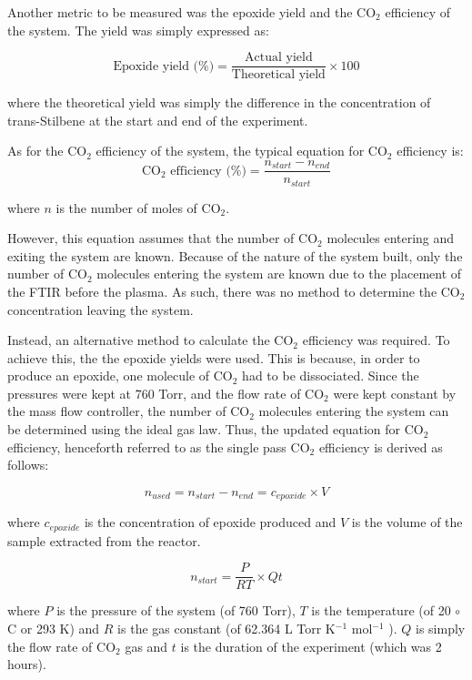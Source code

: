 Another metric to be measured was the epoxide yield and the CO$_2$ efficiency of the system. The yield was simply expressed as:

\begin{equation}
    \text{Epoxide yield (\%)} = \frac{\text{Actual yield}}{\text{Theoretical yield}} \times 100
\end{equation}

where the theoretical yield was simply the difference in the concentration of trans-Stilbene at the start and end of the experiment.

As for the CO$_2$ efficiency of the system, the typical equation for CO$_2$ efficiency is:
\begin{equation}
    \text{CO$_2$ efficiency (\%)} = \frac{n_{start} - n_{end}}{n_{start}}
\end{equation}

where $n$ is the number of moles of CO$_2$. 

However, this equation assumes that the number of CO$_2$ molecules entering and exiting the system are known. Because of the nature of the system built, only the number of CO$_2$ molecules entering the system are known due to the placement of the FTIR before the plasma. As such, there was no method to determine the CO$_2$ concentration leaving the system. 

Instead, an alternative method to calculate the CO$_2$ efficiency was required. To achieve this, the the epoxide yields were used. This is because, in order to produce an epoxide, one molecule of CO$_2$ had to be dissociated. Since the pressures were kept at 760 Torr, and the flow rate of CO$_2$ were kept constant by the mass flow controller, the number of CO$_2$ molecules entering the system can be determined using the ideal gas law. Thus, the updated equation for CO$_2$ efficiency, henceforth referred to as the single pass CO$_2$ efficiency is derived as follows:

\begin{equation}
    n_{used} = n_{start} - n_{end} = c_{epoxide} \times V
\end{equation}

where $c_{epoxide}$ is the concentration of epoxide produced and $V$ is the volume of the sample extracted from the reactor.

\begin{equation}
    n_{start} = \frac{P}{RT} \times Qt
\end{equation}

where $P$ is the pressure of the system (of 760 Torr), $T$ is the temperature (of 20 $\circ$C or 293 K) and $R$ is the gas constant (of 62.364 L Torr K$^{-1}$ mol$^{-1}$ ). $Q$ is simply the flow rate of CO$_2$ gas and $t$ is the duration of the experiment (which was 2 hours).

